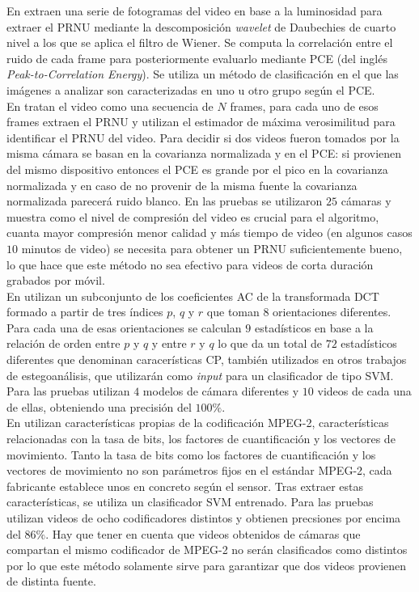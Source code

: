En \cite{naveen:2016} extraen una serie de fotogramas del video en base a la luminosidad para extraer el PRNU mediante la descomposición \textit{wavelet} de Daubechies de cuarto nivel a los que se aplica el filtro de Wiener. Se computa la correlación entre el ruido de cada frame para posteriormente evaluarlo mediante PCE (del inglés \textit{Peak-to-Correlation Energy}). Se utiliza un método de clasificación en el que las imágenes a analizar son caracterizadas en uno u otro grupo según el PCE. \\

En \cite{chen:2007} tratan el video como una secuencia de $N$ frames, para cada uno de esos frames extraen el PRNU y utilizan el estimador de máxima verosimilitud para identificar el PRNU del video. Para decidir si dos videos fueron tomados por la misma cámara se basan en la covarianza normalizada y en el PCE: si provienen del mismo dispositivo entonces el PCE es grande por el pico en la covarianza normalizada y en caso de no provenir de la misma fuente la covarianza normalizada parecerá ruido blanco. En las pruebas se utilizaron $25$ cámaras y muestra como el nivel de compresión del video es crucial para el algoritmo, cuanta mayor compresión menor calidad y más tiempo de video (en algunos casos $10$ minutos de video) se necesita para obtener un PRNU suficientemente bueno, lo que hace que este método no sea efectivo para videos de corta duración grabados por móvil. \\ 

En \cite{yahaya:2012} utilizan un subconjunto de los coeficientes AC de la transformada DCT formado a partir de tres índices $p$, $q$ y $r$ que toman $8$ orientaciones diferentes. Para cada una de esas orientaciones se calculan $9$ estadísticos en base a la relación de orden entre $p$ y $q$ y entre $r$ y $q$ lo que da un total de $72$ estadísticos diferentes que denominan caracerísticas CP, también utilizados en otros trabajos de estegoanálisis, que utilizarán como \textit{input} para un clasificador de tipo SVM. Para las pruebas utilizan $4$ modelos de cámara diferentes y $10$ videos de cada una de ellas, obteniendo una precisión del $100\%$. \\

En \cite{dong:2010} utilizan características propias de la codificación MPEG-2, características relacionadas con la tasa de bits, los factores de cuantificación y los vectores de movimiento. Tanto la tasa de bits como los factores de cuantificación y los vectores de movimiento no son parámetros fijos en el estándar MPEG-2, cada fabricante establece unos en concreto según el sensor. Tras extraer estas características, se utiliza un clasificador SVM entrenado. Para las pruebas utilizan videos de ocho codificadores distintos y obtienen precsiones por encima del $86\%$. Hay que tener en cuenta que videos obtenidos de cámaras que compartan el mismo codificador de MPEG-2 no serán clasificados como distintos por lo que este método solamente sirve para garantizar que dos videos provienen de distinta fuente. \\

